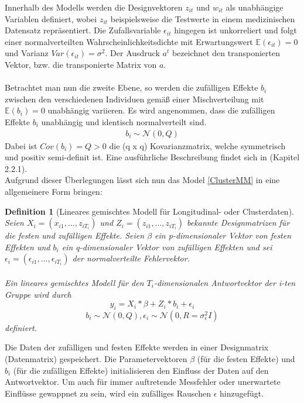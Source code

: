 \documentclass[%
thesis=student,%
coverpage=false,%
titlepage=false,%
headmarks=true, %
german,%
font=libertine, %
math=newpxtx, %
BCOR=5mm,%
coverBCOR=11mm%
]{tumbook}
\theoremstyle{break}
\newtheorem{definition}{Definition}[section]
\begin{document}
Innerhalb des Modells werden die Designvektoren $z_{it}$ und $w_{it}$ als unabhängige Variablen definiert, wobei $z_{it}$ beispielsweise die Testwerte in einem medizinischen Datensatz repräsentiert. Die Zufallsvariable $\epsilon_{it}$ hingegen ist unkorreliert und folgt einer normalverteilten Wahrscheinlichkeitsdichte mit Erwartungswert $ \mathbb{E}(\epsilon_{it}) = 0$ und Varianz $Var(\epsilon_{it}) = \sigma^2$.  Der Ausdruck $a^t$ bezeichnet den transponierten Vektor, bzw. die transponierte Matrix von $a$.\\
\\
Betrachtet man nun die zweite Ebene, so werden die zufälligen Effekte $b_i$ zwischen den verschiedenen Individuen gemäß einer Mischverteilung mit $ \mathbb{E}(b_i)=0$ unabhängig variieren. Es wird angenommen, dass die zufälligen Effekte $b_i$ unabhängig und identisch normalverteilt sind.
\begin{align}
	b_i \sim \mathcal{N}(0,Q)
\end{align}\noindent
Dabei ist $Cov(b_i) = Q > 0$ die (q x q) Kovarianzmatrix, welche symmetrisch und positiv semi-definit ist. Eine ausführliche Beschreibung findet sich in \cite{pinheiro2000} (Kapitel 2.2.1).
\\
Aufgrund dieser Überlegungen lässt sich nun das Model \ref{ClusterMM} in eine allgemeinere Form bringen:
\begin{definition}[Lineares gemischtes Modell für Longitudinal- oder Clusterdaten] \label{LMM für longitudinale Daten}
	Seien $X_i = (x_{i1}, ..., z_{iT_i})$  und $Z_i = (z_{i1},...,z_{iT_i})$ bekannte Designmatrizen für die festen und zufälligen Effekte. Seien $\beta$ ein p-dimensionaler Vektor von festen Effekten und $b_i$ ein q-dimensionaler Vektor von zufälligen Effekten und sei $\epsilon_i = (\epsilon_{i1},...,\epsilon_{iT_i})$ der normalverteilte Fehlervektor.\\
	\\
	Ein lineares gemischtes Modell für den $T_i$-dimensionalen Antwortvektor der i-ten Gruppe wird durch 
	$$y_i = X_i * \beta + Z_i * b_i + \epsilon_i$$ 
	$$b_i \sim \mathcal{N}(0,Q), \epsilon_i \sim \mathcal{N}(0,R = \sigma^2_\epsilon I)$$
	definiert.
\end{definition}\noindent
Die Daten der zufälligen und festen Effekte werden in einer Designmatrix (Datenmatrix) gespeichert. Die Parametervektoren $\beta$ (für die festen Effekte) und $b_i$ (für die zufälligen Effekte) initialisieren den Einfluss der Daten auf den Antwortvektor. Um auch für immer auftretende Messfehler oder unerwartete Einflüsse gewappnet zu sein, wird ein zufälliges Rauschen $\epsilon$ hinzugefügt.\\
\end{document}
